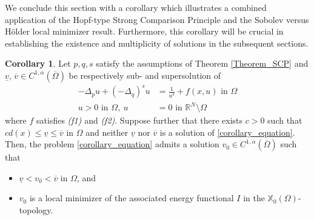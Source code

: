 \documentclass[reqno,oneside]{amsart}
\theoremstyle{definition}
\newtheorem{corollary}{Corollary}[theorem]
\theoremstyle{remark}
\numberwithin{equation}{section}
\newcommand{\Om} {\Omega}
\newcommand{\coa}{C^{1,\alpha}(\overline{\Om})}
\newcommand{\p}{\Delta_p}
\newcommand{\qs}{(-\Delta_q)^s}
\newcommand{\bdry}{\mathbb{R}^N \setminus \Omega}
\newcommand{\xo}{\mathbb{X}_0}
\begin{document}
We conclude this section with a corollary which illustrates a combined application of the Hopf-type Strong Comparison Principle and the Sobolev versus H\"older local minimizer result. Furthermore, this corollary will be crucial in establishing the existence and multiplicity of solutions in the subsequent sections.

\begin{corollary}\label{corollary}
    Let $p,q,s$ satisfy the assumptions of Theorem \ref{Theorem_SCP} and $\underline{v}$, $\overline{v} \in \coa$ be respectively sub- and supersolution of
    \begin{equation}\label{corollary_equation}
        \begin{aligned}
            -\p u + \qs u &= \frac{1}{u^{\delta}} + f(x,u) \text{ in } \Om\\
            u > 0 \text{ in } \Om,\ u &=0 \text{ in } \bdry
        \end{aligned}
    \end{equation}
    where $f$ satisfies \textit{(f1)} and \textit{(f2)}. Suppose further that there exists $c>0$ such that $c d(x) \leq \underline{v} \leq \overline{v}$ in $\Om$ and neither $\underline{v}$ nor $\overline{v}$ is a solution of \eqref{corollary_equation}. Then, the problem \eqref{corollary_equation} admits a solution $v_0 \in \coa$ such that
    \begin{itemize}
        \item[\textit{(a)}] $\underline{v} < v_0 < \overline{v}$ in $\Om$, and

        \item[\textit{(b)}] $v_0$ is a local minimizer of the associated energy functional $I$ in the $\xo (\Om)$-topology.
    \end{itemize}
\end{corollary}
\end{document}
